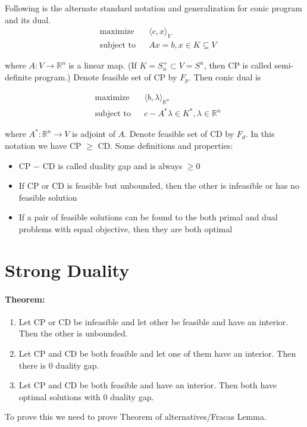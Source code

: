 \documentclass[a4paper,11pt]{article}
\newcommand{\Rn}{\mathbb{R}^n}
\newcommand\inrpd[2]{\langle #1, #2 \rangle}
\begin{document}
Following is the alternate standard notation and generalization for conic program and its dual.
\begin{equation}
\begin{aligned}
& \underset{}{\text{maximize}}
& &\inrpd{c}{x}_V \\
& \text{subject to}
& & Ax = b , x\in K \subseteq V
\end{aligned}
\tag{CP}
\end{equation}

where $A:V \rightarrow \Rn$ is a linear map. (If $K = S_n^+ \subset V = S^n$, then CP is called semi-definite program.)
Denote feasible set of CP by $F_p$. Then conic dual is 

\begin{equation}
\begin{aligned}
& \underset{}{\text{maximize}}
& &\inrpd{b}{\lambda}_{\Rn} \\
& \text{subject to}
& & c - A^*\lambda \in K^* , \lambda \in \Rn 
\end{aligned}
\tag{CD}
\end{equation}

where $A^*:\Rn \rightarrow V$ is adjoint of $A$. Denote feasible set of CD by $F_d$. In this notation we have CP $\geq$ CD. Some definitions and properties:
\begin{itemize}
\item CP $-$ CD is called duality gap and is always $\geq 0$
\item If CP or CD is feasible but unbounded, then the other is infeasible or has no feasible solution
\item If a pair of feasible solutions can be found to the both primal and dual problems with equal objective, then they are both optimal
\end{itemize}

\section{Strong Duality}
\paragraph{Theorem:}
\begin{enumerate}
\item Let CP or CD be infeasible and let other be feasible and have an interior. Then the other is unbounded.
\item Let CP and CD be both feasible and let one of them have an interior. Then there is $0$ duality gap.
\item Let CP and CD be both feasible and have an interior. Then both have optimal solutions with  $0$ duality gap.
\end{enumerate}
To prove this we need to prove Theorem of alternatives/Fracas Lemma.
\end{document}
